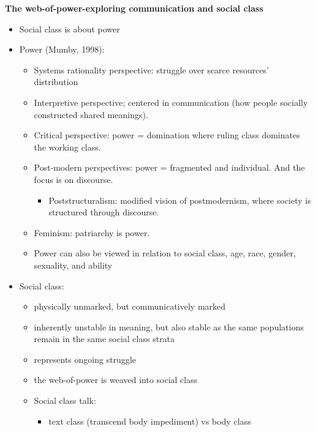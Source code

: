 \documentclass[
]{book}
\providecommand{\tightlist}{%
  \setlength{\itemsep}{0pt}\setlength{\parskip}{0pt}}
\begin{document}
\textbf{The web-of-power-exploring communication and social class}

\begin{itemize}
\item
  Social class is about power
\item
  Power (Mumby, 1998):

  \begin{itemize}
  \item
    Systems rationality perspective: struggle over scarce resources'
    distribution
  \item
    Interpretive perspective; centered in communication (how people
    socially constructed shared meanings).
  \item
    Critical perspective: power = domination where ruling class
    dominates the working class.
  \item
    Post-modern perspectives: power = fragmented and individual. And
    the focus is on discourse.

    \begin{itemize}
    \tightlist
    \item
      Poststructuralism: modified vision of postmodernism, where
      society is structured through discourse.
    \end{itemize}
  \item
    Feminism: patriarchy is power.
  \item
    Power can also be viewed in relation to social class, age, race,
    gender, sexuality, and ability
  \end{itemize}
\item
  Social class:

  \begin{itemize}
  \item
    physically unmarked, but communicatively marked
  \item
    inherently unstable in meaning, but also stable as the same
    populations remain in the same social class strata
  \item
    represents ongoing struggle
  \item
    the web-of-power is weaved into social class
  \item
    Social class talk:

    \begin{itemize}
    \tightlist
    \item
      text class (transcend body impediment) vs body class
    \end{itemize}
  \end{itemize}
\end{itemize}
\end{document}
